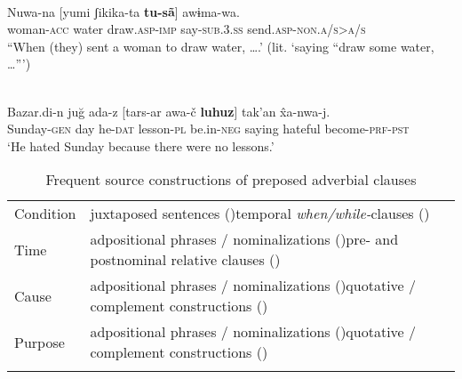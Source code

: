\documentclass[output=paper]{langsci/langscibook}
\begin{document}
\ea\label{ex:diessel:15}
\\
\gll   Nuwa-na  [yumi  ʃikika-ta  \textbf{tu-sã}]  awɨma-wa.\\
       woman-\textsc{acc}  water  draw.\textsc{asp-imp}  say-\textsc{sub.3.ss}  send.\textsc{asp-non.a/s>a/s}\\
\glt “When (they) sent a woman to draw water, ….' (lit. ‘saying “draw some water, …”’) 
\z

\ea\label{ex:diessel:16}
\\
\gll   Bazar.di-n  juğ  ada-z  [tars-ar  awa-č   \textbf{luhuz}]  tak’an  \^{x}a-nwa-j.\\
       Sunday-\textsc{gen}  day  he-\textsc{dat}  lesson-\textsc{pl}  be.in-\textsc{neg}   saying  hateful  become-\textsc{prf-pst}\\
\glt   `He hated Sunday because there were no lessons.'
\z

\begin{table}
\begin{tabularx}{\textwidth}{lQ}
\lsptoprule
Condition & juxtaposed sentences (\citealt{Haiman1985})\newline 	  temporal \textit{when/while-}clauses (\citealt{Traugott1985})\\
\tablevspace
Time      & adpositional phrases / nominalizations (\citealt{Genetti1991})\newline 	  pre- and postnominal relative clauses (\citealt{Givón1991})\\
\tablevspace
Cause    &  adpositional phrases / nominalizations (\citealt{Genetti1991})\newline 	  quotative / complement constructions (\citealt{Ebert1991})\\
\tablevspace
Purpose &  adpositional phrases / nominalizations (\citealt{Schmidtke-Bode2009})\newline  quotative / complement constructions (\citealt{Güldemann2008})\\
\lspbottomrule
\end{tabularx}

\caption{Frequent source constructions of preposed adverbial clauses}
\label{tab:diessel:4}
\end{table}
\end{document}
